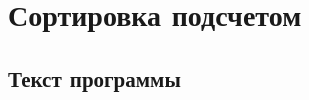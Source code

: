 \documentclass[bachelor, och, referat, times]{SCWorks}
\begin{document}
    
   
    
    \maketitle

    
    

    
    
   
    
    
    
    

    \section{Сортировка подсчетом}
    \subsection{Текст программы}
\end{document}
